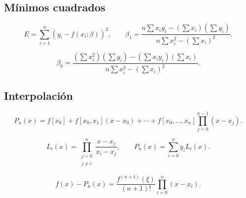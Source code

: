 \documentclass[a4paper,12pt]{article}
\theoremstyle{definition}
\theoremstyle{plain}
\begin{document}
\subsection{Mínimos cuadrados}

\[
E=\sum_{i=1}^n \left(y_i-f(x_i;\beta)\right)^2,
\qquad
\beta_1=\frac{n\sum x_i y_i-\left(\sum x_i\right)\left(\sum y_i\right)}
             {n\sum x_i^2-\left(\sum x_i\right)^2}.
\]

\[
\beta_0=\frac{\left(\sum x_i^2\right)\left(\sum y_i\right)
             -\left(\sum x_i y_i\right)\left(\sum x_i\right)}
             {n\sum x_i^2-\left(\sum x_i\right)^2}.
\]

\subsection{Interpolación}

\[
P_n(x)=f[x_0]+f[x_0,x_1](x-x_0)+\cdots
       +f[x_0,\dots,x_n]\prod_{j=0}^{n-1}(x-x_j).
\]

\[
L_i(x)=\prod_{\substack{j=0\\j\neq i}}^n \frac{x-x_j}{x_i-x_j},
\qquad
P_n(x)=\sum_{i=0}^n y_i L_i(x).
\]

\[
f(x)-P_n(x)=\frac{f^{(n+1)}(\xi)}{(n+1)!}\prod_{i=0}^n (x-x_i).
\]
\end{document}
